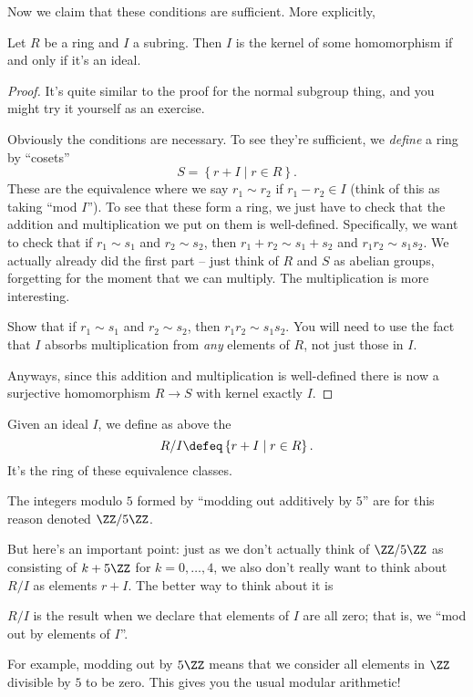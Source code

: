Now we claim that these conditions are sufficient.
More explicitly,
\begin{theorem}
	Let $R$ be a ring and $I$ a subring.
	Then $I$ is the kernel of some homomorphism if and only if it's an ideal.
\end{theorem}
\begin{proof}
	It's quite similar to the proof for the normal subgroup thing,
	and you might try it yourself as an exercise.
	
	Obviously the conditions are necessary.
	To see they're sufficient, we \emph{define} a ring by ``cosets''
	\[ S = \left\{ r + I \mid r \in R \right\}. \]
	These are the equivalence where we say $r_1 \sim r_2$ if $r_1 - r_2 \in I$
	(think of this as taking ``mod $I$'').
	To see that these form a ring, we just have to check that the addition
	and multiplication we put on them is well-defined.
	Specifically, we want to check that if $r_1 \sim s_1$ and $r_2 \sim s_2$,
	then $r_1 + r_2 \sim s_1 + s_2$ and $r_1r_2 \sim s_1s_2$.
	We actually already did the first part -- just think of $R$ and $S$ as abelian
	groups, forgetting for the moment that we can multiply.
	The multiplication is more interesting.
	\begin{exercise}
		[Recommended]
		Show that if $r_1 \sim s_1$ and $r_2 \sim s_2$, then $r_1r_2 \sim s_1s_2$.
		You will need to use the fact that $I$ absorbs multiplication
		from \emph{any} elements of $R$, not just those in $I$.
	\end{exercise}
	Anyways, since this addition and multiplication is well-defined there
	is now a surjective homomorphism $R \to S$ with kernel exactly $I$.
\end{proof}

\begin{definition}
	Given an ideal $I$, we define as above the 
	\[ R/I \defeq \left\{ r+I \mid r \in R \right\}. \]
	It's the ring of these equivalence classes.
\end{definition}
\begin{example}
	The integers modulo $5$ formed by ``modding out additively by $5$''
	are for this reason denoted $\ZZ / 5\ZZ$.
\end{example}
But here's an important point:
just as we don't actually think of $\ZZ/5\ZZ$ as consisting of
$k + 5\ZZ$ for $k=0,\dots,4$,
we also don't really want to think about $R/I$ as elements $r+I$.
The better way to think about it is
\begin{moral}
	$R/I$ is the result when we declare that elements of $I$ are all zero;
	that is, we ``mod out by elements of $I$''.
\end{moral}
For example, modding out by $5\ZZ$ means that we consider
all elements in $\ZZ$ divisible by $5$ to be zero.
This gives you the usual modular arithmetic!


